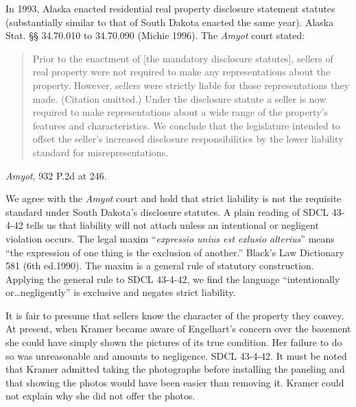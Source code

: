 In 1993, Alaska enacted residential real property disclosure statement statutes
(substantially similar to that of South Dakota enacted the same year). Alaska
Stat. {\S}{\S} 34.70.010 to 34.70.090 (Michie
1996). The
\textit{Amyot} court stated:
\begin{quote}
Prior to the enactment of [the mandatory disclosure statutes], sellers of real
property were not required to make any representations about the property.
However, sellers were strictly liable for those representations they made.
(Citation omitted.) Under the disclosure statute a seller is now required to
make representations about a wide range of the property's features and
characteristics. We conclude that the legislature intended to offset the
seller's increased disclosure responsibilities by the lower liability standard
for misrepresentations.
\end{quote}
\textit{Amyot}, 932 P.2d at 246.

We agree with the \textit{Amyot} court and hold that strict liability is not the
requisite standard under South Dakota's disclosure statutes. A plain reading of
SDCL 43-4-42 tells us that liability will not attach unless an intentional or
negligent violation occurs. The legal maxim ``\textit{expressio unius est
exlusio alterius}'' means ``the expression of one thing is the exclusion of
another.'' Black's Law Dictionary 581 (6th ed.1990). The maxim is a general
rule of statutory construction. Applying the general rule to SDCL 43-4-42, we
find the language ``intentionally or\ldots negligently'' is exclusive and
negates
strict liability.

It is fair to presume that sellers know the character of the property they
convey. At present, when Kramer became aware of Engelhart's concern over the
basement she could have simply shown the pictures of its true condition. Her
failure to do so was unreasonable and amounts to negligence. SDCL 43-4-42. It
must be noted that Kramer admitted taking the photographs before installing the
paneling and that showing the photos would have been easier than removing it.
Kramer could not explain why she did not offer the photos.

